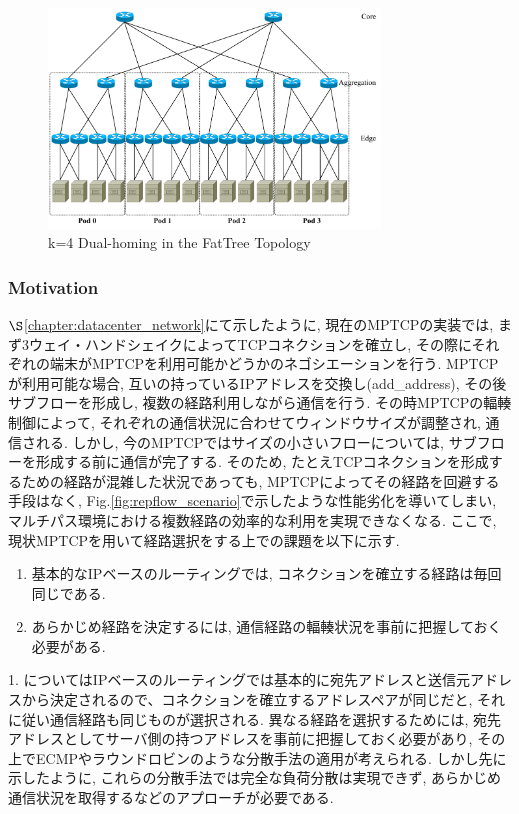 \begin{figure}[t]
    \begin{center}
    \includegraphics[autoebb, width=250pt]{./img/mhft.pdf}
    \caption{k=4 Dual-homing in the FatTree Topology}
    \label{fig:dual-homing}
    \end{center}
\end{figure}

\subsubsection{Motivation}

$\S$\ref{chapter:datacenter_network}にて示したように, 現在のMPTCPの実装では,
まず3ウェイ・ハンドシェイクによってTCPコネクションを確立し, その際にそれぞれの端末がMPTCPを利用可能かどうかのネゴシエーションを行う.
MPTCPが利用可能な場合, 互いの持っているIPアドレスを交換し(add\_address), その後サブフローを形成し, 複数の経路利用しながら通信を行う. 
その時MPTCPの輻輳制御によって, それぞれの通信状況に合わせてウィンドウサイズが調整され, 通信される\cite{balia}. 
しかし, 今のMPTCPではサイズの小さいフローについては, サブフローを形成する前に通信が完了する. 
そのため, たとえTCPコネクションを形成するための経路が混雑した状況であっても, MPTCPによってその経路を回避する手段はなく,
Fig.\ref{fig:repflow_scenario}で示したような性能劣化を導いてしまい,
マルチパス環境における複数経路の効率的な利用を実現できなくなる. 
ここで, 現状MPTCPを用いて経路選択をする上での課題を以下に示す. 
\begin{enumerate}
\item 基本的なIPベースのルーティングでは, コネクションを確立する経路は毎回同じである. 
\item あらかじめ経路を決定するには, 通信経路の輻輳状況を事前に把握しておく必要がある. 
\end{enumerate} 
1. についてはIPベースのルーティングでは基本的に宛先アドレスと送信元アドレスから決定されるので、コネクションを確立するアドレスペアが同じだと,
それに従い通信経路も同じものが選択される. 
異なる経路を選択するためには, 宛先アドレスとしてサーバ側の持つアドレスを事前に把握しておく必要があり,
その上でECMPやラウンドロビンのような分散手法の適用が考えられる.
しかし先に示したように, これらの分散手法では完全な負荷分散は実現できず, あらかじめ通信状況を取得するなどのアプローチが必要である. 


